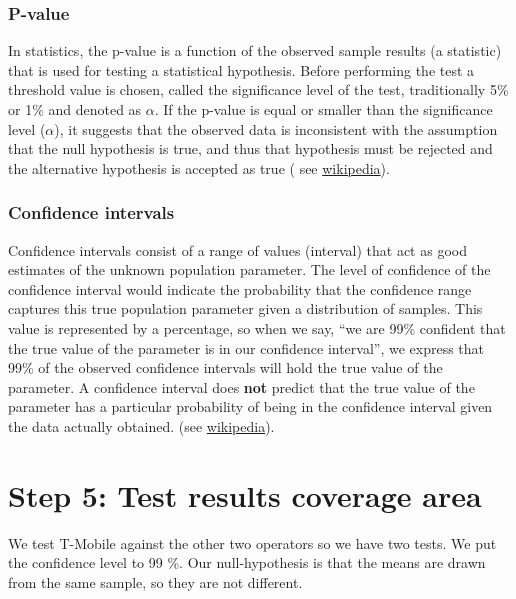 \documentclass[]{article}
\begin{document}
\subsubsection{P-value}\label{p-value}

In statistics, the p-value is a function of the observed sample results
(a statistic) that is used for testing a statistical hypothesis. Before
performing the test a threshold value is chosen, called the significance
level of the test, traditionally 5\% or 1\% and denoted as $\alpha$. If
the p-value is equal or smaller than the significance level ($\alpha$),
it suggests that the observed data is inconsistent with the assumption
that the null hypothesis is true, and thus that hypothesis must be
rejected and the alternative hypothesis is accepted as true ( see
\href{https://en.wikipedia.org/wiki/P-value}{wikipedia}).

\subsubsection{Confidence intervals}\label{confidence-intervals}

Confidence intervals consist of a range of values (interval) that act as
good estimates of the unknown population parameter. The level of
confidence of the confidence interval would indicate the probability
that the confidence range captures this true population parameter given
a distribution of samples. This value is represented by a percentage, so
when we say, ``we are 99\% confident that the true value of the
parameter is in our confidence interval'', we express that 99\% of the
observed confidence intervals will hold the true value of the parameter.
A confidence interval does \textbf{not} predict that the true value of
the parameter has a particular probability of being in the confidence
interval given the data actually obtained. (see
\href{https://en.wikipedia.org/wiki/Confidence_interval}{wikipedia}).

\newpage

\section{Step 5: Test results coverage
area}\label{step-5-test-results-coverage-area}

We test T-Mobile against the other two operators so we have two tests.
We put the confidence level to 99 \%. Our null-hypothesis is that the
means are drawn from the same sample, so they are not different.
\end{document}
